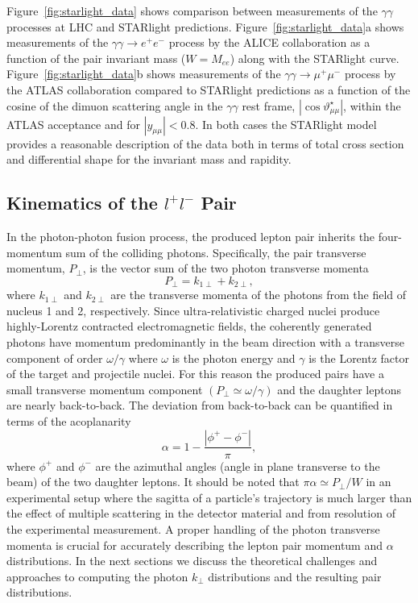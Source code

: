 \documentclass[twocolumn,epjc3]{svjour3}\sloppy
\begin{document}
Figure~\ref{fig:starlight_data} shows comparison between measurements of the $\gamma\gamma$ processes at LHC and STARlight predictions. 
Figure~\ref{fig:starlight_data}a shows measurements of the $\gamma\gamma \rightarrow e^+e^-$ process by the ALICE collaboration as a function of the pair invariant mass ($W=M_{ee}$) along with the STARlight curve. Figure~\ref{fig:starlight_data}b shows measurements of the $\gamma\gamma \rightarrow \mu^+\mu^-$ process by the ATLAS collaboration compared to STARlight predictions as a function of the cosine of the dimuon scattering angle in the $\gamma\gamma$ rest frame, $|\cos \vartheta^{\star}_{\mu\mu}|$, within the ATLAS acceptance and for $|y_{\mu\mu}|<0.8$. 
In both cases the STARlight model provides a reasonable description of the data both in terms of total cross section and differential shape for the invariant mass and rapidity.

\subsection{Kinematics of the $l^+l^-$ Pair}
\label{sec:kinematics}

In the photon-photon fusion process, the produced lepton pair inherits the four-momentum sum of the colliding photons. Specifically, the pair transverse momentum, $P_\perp$, is the vector sum of the two photon transverse momenta
\begin{equation}
    P_\perp = k_{1\perp} + k_{2\perp},
\end{equation}
where $k_{1\perp}$ and $k_{2\perp}$ are the transverse momenta of the photons from the field of nucleus 1 and 2, respectively.
Since ultra-relativistic charged nuclei produce highly-Lorentz contracted electromagnetic fields, the coherently generated photons have momentum predominantly in the beam direction with a transverse component of order $\omega/\gamma$ where $\omega$ is the photon energy and $\gamma$ is the Lorentz factor of the target and projectile nuclei. For this reason the produced pairs have a small transverse momentum component $(P_\perp \simeq \omega/\gamma)$ and the daughter leptons are nearly back-to-back. The deviation from back-to-back can be quantified in terms of the acoplanarity 
\begin{equation}
    \alpha = 1 - \frac{|\phi^+ - \phi^-|}{\pi},
\end{equation}
where $\phi^+$ and $\phi^-$ are the azimuthal angles (angle in plane transverse to the beam) of the two daughter leptons. It should be noted that $\pi\alpha \simeq P_\perp / W$ in an experimental setup where the sagitta of a particle's trajectory is much larger than the effect of multiple scattering in the detector material and from resolution of the experimental measurement. A proper handling of the photon transverse momenta is crucial for accurately describing the lepton pair momentum and $\alpha$ distributions. In the next sections we discuss the theoretical challenges and approaches to computing the photon $k_\perp$ distributions and the resulting pair distributions. 
\end{document}
